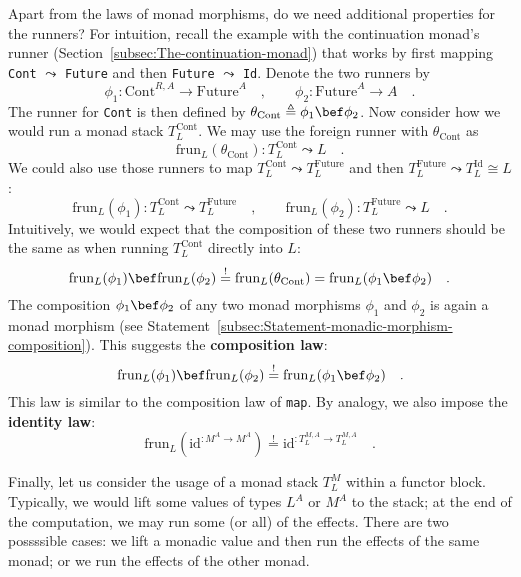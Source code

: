 Apart from the laws of monad morphisms, do we need additional properties
for the runners? For intuition, recall the example with the continuation
monad\textsf{'}s runner (Section~\ref{subsec:The-continuation-monad}) that
works by first mapping \lstinline!Cont! $\leadsto$ \lstinline!Future!
and then \lstinline!Future! $\leadsto$ \lstinline!Id!. Denote the
two runners by
\[
\phi_{1}:\text{Cont}^{R,A}\rightarrow\text{Future}^{A}\quad,\quad\quad\phi_{2}:\text{Future}^{A}\rightarrow A\quad.
\]
The runner for \lstinline!Cont! is then defined by $\theta_{\text{Cont}}\triangleq\phi_{1}\bef\phi_{2}$.
Now consider how we would run a monad stack $T_{L}^{\text{Cont}}$.
We may use the foreign runner with $\theta_{\text{Cont}}$ as
\[
\text{frun}_{L}(\theta_{\text{Cont}}):T_{L}^{\text{Cont}}\leadsto L\quad.
\]
We could also use those runners to map $T_{L}^{\text{Cont}}\leadsto T_{L}^{\text{Future}}$
and then $T_{L}^{\text{Future}}\leadsto T_{L}^{\text{Id}}\cong L$:
\[
\text{frun}_{L}(\phi_{1}):T_{L}^{\text{Cont}}\leadsto T_{L}^{\text{Future}}\quad,\quad\quad\text{frun}_{L}(\phi_{2}):T_{L}^{\text{Future}}\leadsto L\quad.
\]
Intuitively, we would expect that the composition of these two runners
should be the same as when running $T_{L}^{\text{Cont}}$ directly
into $L$:
\[
\text{frun}_{L}(\phi_{1})\bef\text{frun}_{L}(\phi_{2})\overset{!}{=}\text{frun}_{L}(\theta_{\text{Cont}})=\text{frun}_{L}(\phi_{1}\bef\phi_{2})\quad.
\]
The composition $\phi_{1}\bef\phi_{2}$ of any two monad morphisms
$\phi_{1}$ and $\phi_{2}$ is again a monad morphism (see Statement~\ref{subsec:Statement-monadic-morphism-composition}).
This suggests the \textbf{composition law}:
\begin{equation}
\text{frun}_{L}(\phi_{1})\bef\text{frun}_{L}(\phi_{2})\overset{!}{=}\text{frun}_{L}(\phi_{1}\bef\phi_{2})\quad.\label{eq:composition-law-of-frun}
\end{equation}
This law is similar to the composition law of \lstinline!map!. By
analogy, we also impose the \textbf{identity law}:
\[
\text{frun}_{L}(\text{id}^{:M^{A}\rightarrow M^{A}})\overset{!}{=}\text{id}^{:T_{L}^{M,A}\rightarrow T_{L}^{M,A}}\quad.
\]

Finally, let us consider the usage of a monad stack $T_{L}^{M}$ within
a functor block. Typically, we would lift some values of types $L^{A}$
or $M^{A}$ to the stack; at the end of the computation, we may run
some (or all) of the effects. There are two possssible cases: we lift
a monadic value and then run the effects of the same monad; or we
run the effects of the other monad. 

